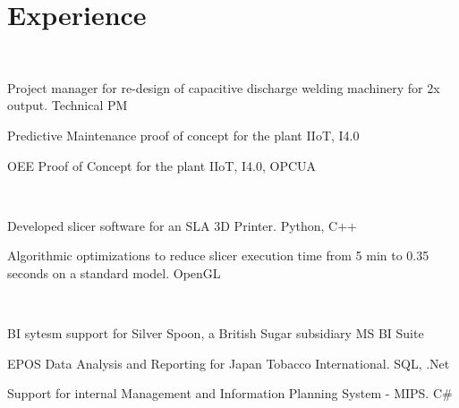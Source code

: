 \documentclass[]{deedy-resume-openfont}
\begin{document}
\hfill
\begin{minipage}[t]{0.66\textwidth} 



\section{Experience}

\sectionsep



\\
\vspace{\topsep}
\begin{tightemize}\item Project manager for re-design of capacitive discharge welding machinery for 2x output. \hfill{ \selectfont Technical PM}
\item Predictive Maintenance proof of concept for the plant \hfill{ \selectfont IIoT, I4.0}
\item OEE Proof of Concept for the plant \hfill{ \selectfont IIoT, I4.0, OPCUA}
\end{tightemize}
\sectionsep

\\
\begin{tightemize}
\item Developed slicer software for an SLA 3D Printer. \hfill {
\selectfont 
Python, C++
} 
\item Algorithmic optimizations to reduce slicer execution time from 5 min to 0.35 seconds on a standard model. \hfill {
\selectfont 
OpenGL
}
\end{tightemize}

\sectionsep{}

\\
\vspace{\topsep} %
\begin{tightemize}
\item BI sytesm support for Silver Spoon, a British Sugar subsidiary \hfill {
\selectfont MS BI Suite}
	\item EPOS Data Analysis and Reporting for Japan Tobacco International. \hfill{
\selectfont SQL, .Net}
	\item  Support for internal Management and Information Planning System - MIPS. \hfill{ \selectfont C\#}
\end{tightemize}
\sectionsep


\end{minipage}
\end{document}
